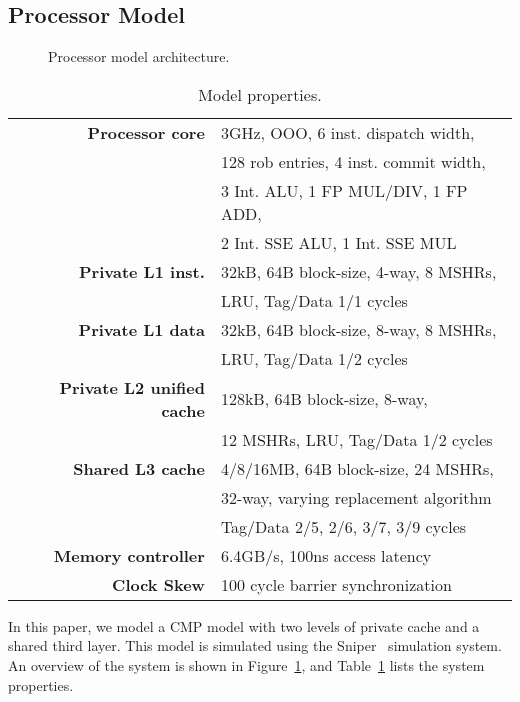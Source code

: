 
\subsection{Processor Model}
\begin{figure}[t]
\centering
\caption{Processor model architecture.}
\label{fig:processor_model}
\end{figure}


\begin{table}[ht]
\centering
\begin{tabular}{rl}
\toprule
\bf{Processor core}                 & 3GHz, OOO, 6 inst. dispatch width,     \\
                                    & 128 rob entries, 4 inst. commit width, \\
                                    & 3 Int. ALU, 1 FP MUL/DIV, 1 FP ADD, \\
                                    & 2 Int. SSE ALU, 1 Int. SSE MUL \\
\bf{Private L1 inst.}               & 32kB, 64B block-size, 4-way, 8 MSHRs, \\
									& LRU, Tag/Data 1/1 cycles \\
\bf{Private L1 data}                & 32kB, 64B block-size, 8-way, 8 MSHRs, \\
									& LRU, Tag/Data 1/2 cycles \\
\bf{Private L2 unified cache}       & 128kB, 64B block-size, 8-way, \\
                                    & 12 MSHRs, LRU, Tag/Data 1/2 cycles     \\
\bf{Shared L3 cache}                & 4/8/16MB, 64B block-size, 24 MSHRs, \\
                                    & 32-way, varying replacement algorithm \\
                                    & Tag/Data 2/5, 2/6, 3/7, 3/9 cycles         \\
\bf{Memory controller}              & 6.4GB/s, 100ns access latency         \\
\bf{Clock Skew}                     & 100 cycle barrier synchronization        \\
\bottomrule                             
\end{tabular}
\caption{Model properties.}
\label{tbl:processor_model:properties}
\end{table}

In this paper, we model a CMP model with two levels of private cache and a shared third layer.
This model is simulated using the Sniper~\cite{Carlson2011a} simulation system.
An overview of the system is shown in Figure~\ref{fig:processor_model}, and Table~\ref{tbl:processor_model:properties} lists the system properties.

